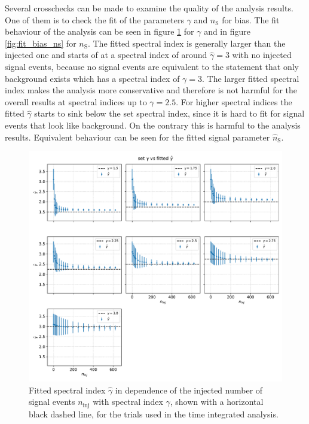Several crosschecks can be made to examine the quality of the analysis results.
One of them is to check the fit of the parameters $\gamma$ and $n_\text{S}$ for bias.
The fit behaviour of the analysis can be seen in figure \ref{fig:fit_bias_gamma} for $\gamma$ and in figure \ref{fig:fit_bias_ns} for $n_\text{S}$.
The fitted spectral index is generally larger than the injected one and starts of at a spectral index of around $\hat\gamma = \num{3}$ with no injected signal events, because no signal events are equivalent to the statement that only background exists which has a spectral index of $\gamma = \num{3}$.
The larger fitted spectral index makes the analysis more conservative and therefore is not harmful for the overall results at spectral indices up to $\gamma = \num{2.5}$.
For higher spectral indices the fitted $\hat\gamma$ starts to sink below the set spectral index, since it is hard to fit for signal events that look like background. On the contrary this is harmful to the analysis results.
Equivalent behaviour can be seen for the fitted signal parameter $\hat{n}_\text{S}$.
\begin{figure}
    \centering
    \includegraphics[width=\linewidth]{Plots/05_csky/gamma_fit_auto_3.pdf}
    \caption{Fitted spectral index $\hat\gamma$ in dependence of the injected number of signal events $n_\text{inj}$ with spectral index $\gamma$, shown with a horizontal black dashed line, for the trials used in the time integrated analysis.}
    \label{fig:fit_bias_gamma}
\end{figure}

